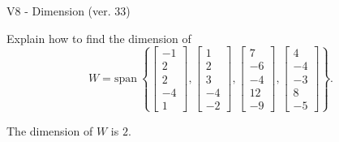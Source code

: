 \begin{exercise}
  \begin{exerciseTitle}V8 - Dimension (ver. 33)\end{exerciseTitle}
  \begin{exerciseStatement}
    Explain how to find the dimension of 
\[W=\mathrm{span}\ \left\{\left[\begin{array}{r}
-1 \\
2 \\
2 \\
-4 \\
1
\end{array}\right] , \left[\begin{array}{r}
1 \\
2 \\
3 \\
-4 \\
-2
\end{array}\right] , \left[\begin{array}{r}
7 \\
-6 \\
-4 \\
12 \\
-9
\end{array}\right] , \left[\begin{array}{r}
4 \\
-4 \\
-3 \\
8 \\
-5
\end{array}\right]\right\}.\]



  \end{exerciseStatement}
  \begin{exerciseAnswer}
   The dimension of \(W\) is  \(2\).
  


  \end{exerciseAnswer}
\end{exercise}